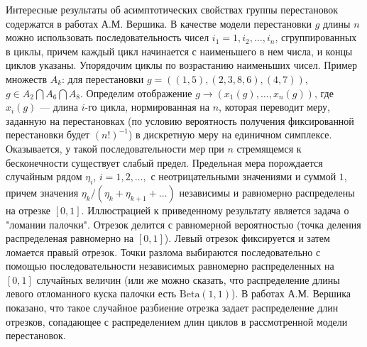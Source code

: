 \begin{remark}
Интересные результаты об асимптотических свойствах группы перестановок содержатся в работах А.М. Вершика. 
В качестве модели перестановки $g$ длины $n$ можно использовать последовательность чисел $i_1=1,i_2,\dots,i_n$, сгруппированных в циклы, причем каждый цикл начинается с наименьшего в нем числа, и концы циклов указаны. Упорядочим циклы по возрастанию наименьших чисел. 
Пример множеств $A_k$: для перестановки $g = ((1,5),(2,3,8,6),(4,7))$, $g\in A_2 \bigcap A_6 \bigcap A_8$. Определим отображение $g\to (x_1(g),\dots,x_n(g))$, где $x_i(g)$ --- длина $i$-го цикла, нормированная на $n$, которая переводит меру, заданную на перестановках (по условию вероятность получения фиксированной перестановки будет $(n!)^{-1}$)  в дискретную меру на единичном  симплексе. Оказывается, у такой последовательности мер при $n$ стремящемся к бесконечности существует слабый  предел. Предельная мера порождается случайным рядом $\eta_i$, $i=1,2,\dots,$ с неотрицательными значениями и суммой $1$, причем значения $\eta_k/(\eta_k+\eta_{k+1}+\dots)$ независимы и равномерно распределены  на отрезке $[0,1]$. Иллюстрацией к приведенному результату является задача о "ломании палочки". Отрезок делится с равномерной вероятностью (точка деления распределеная равномерно на $[0,1]$). Левый отрезок фиксируется и затем ломается правый отрезок. Точки разлома выбираются последовательно с помощью последовательности независимых равномерно распределенных на $[0,1]$ случайных величин (или же можно сказать, что распределение длины левого отломанного куска палочки есть $\mathrm{Beta}(1, 1)$).  В работах А.М. Вершика показано, что такое случайное разбиение отрезка задает распределение длин отрезков, сопадающее с распределением длин циклов в рассмотренной модели перестановок. 


\end{remark}
